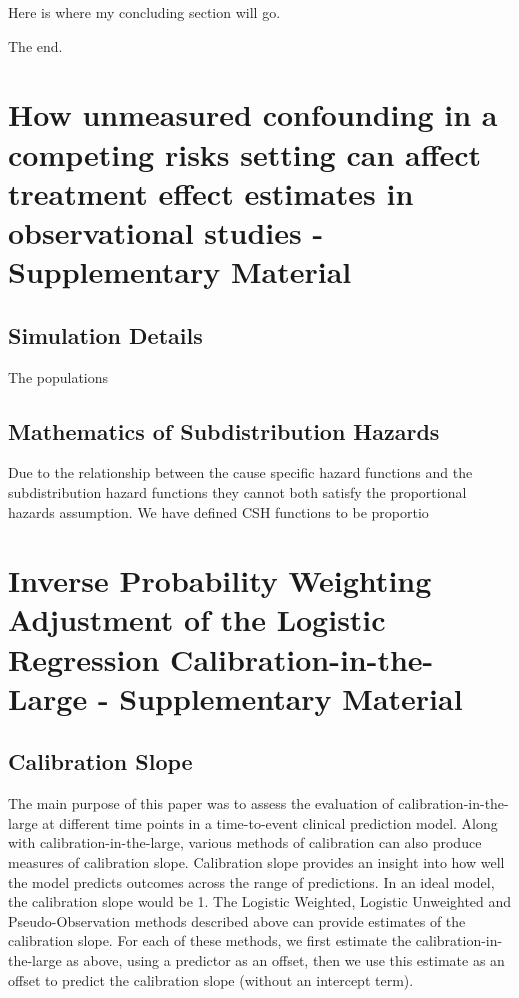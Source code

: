 \documentclass[12pt,PhD,twoside,openright]{muthesis}
\begin{document}
Here is where my concluding section will go.

The end.

\hypertarget{appendix-appendices}{%
\appendix}


\hypertarget{chap-Conf-CR-supp}{%
\chapter{How unmeasured confounding in a competing risks setting can affect treatment effect estimates in observational studies - Supplementary Material}\label{chap-Conf-CR-supp}}


\hypertarget{simulation-details}{%
\section{Simulation Details}\label{simulation-details}}

The populations

\hypertarget{mathematics-of-subdistribution-hazards}{%
\section{Mathematics of Subdistribution Hazards}\label{mathematics-of-subdistribution-hazards}}

Due to the relationship between the cause specific hazard functions and the subdistribution hazard functions they cannot both satisfy the proportional hazards assumption. We have defined CSH functions to be proportio

\hypertarget{chap-IPCW-logistic-supp}{%
\chapter{Inverse Probability Weighting Adjustment of the Logistic Regression Calibration-in-the-Large - Supplementary Material}\label{chap-IPCW-logistic-supp}}


\hypertarget{calibration-slope}{%
\section{Calibration Slope}\label{calibration-slope}}

The main purpose of this paper was to assess the evaluation of calibration-in-the-large at different time points in a time-to-event clinical prediction model. Along with calibration-in-the-large, various methods of calibration can also produce measures of calibration slope. Calibration slope provides an insight into how well the model predicts outcomes across the range of predictions. In an ideal model, the calibration slope would be 1. The Logistic Weighted, Logistic Unweighted and Pseudo-Observation methods described above can provide estimates of the calibration slope. For each of these methods, we first estimate the calibration-in-the-large as above, using a predictor as an offset, then we use this estimate as an offset to predict the calibration slope (without an intercept term).
\end{document}
